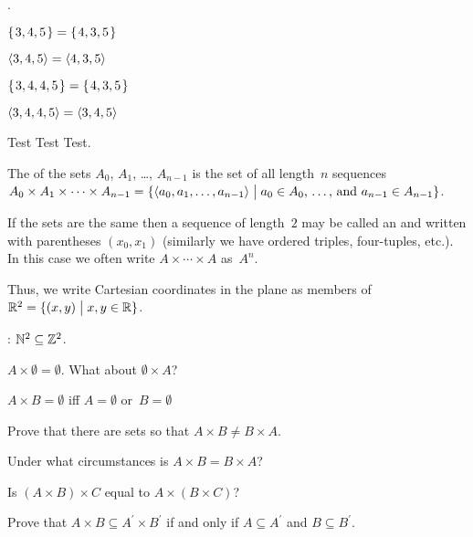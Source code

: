 \documentclass{ibl}
\begin{document}
\begin{ex}\pord.
\begin{exes}
\item $\mbox{$\{\hspace{0.1em}3, 4, 5\hspace{0.1em}\}$}=\mbox{$\{\hspace{0.1em}4, 3, 5\hspace{0.1em}\}$}$
\item $\langle3, 4, 5\rangle=\langle4, 3, 5\rangle$
\item $\mbox{$\{\hspace{0.1em}3, 4, 4, 5\hspace{0.1em}\}$}=\mbox{$\{\hspace{0.1em}4, 3, 5\hspace{0.1em}\}$}$
\item $\langle3, 4,4,5\rangle=\langle3,4,5\rangle$  
\end{exes}
\begin{ans}
 Test Test Test.
\end{ans}
\end{ex}

\begin{df}
The  of the sets $A_0$, $A_1$, \ldots, $A_{n-1}$ 
is the set of all length~$n$ sequences
$A_0\times A_1\times \cdots \times A_{n-1}
  =\{\langle a_0,a_1,\ldots,a_{n-1}\rangle \bigm| \text{$a_0\in A_0$, \ldots, and~$a_{n-1}\in A_{n-1}$}\}$.

If the sets are the same then 
a sequence of length~$2$ may be called an  and 
written with parentheses $(x_0,x_1)$
(similarly we have ordered triples, four-tuples, etc.).
In this case we often write $A\times\cdots\times A$ 
as~$A^n$.
\end{df}

Thus, we write 
Cartesian coordinates in the plane as members of
$\mathbb{R}^2=\{(x,y) \bigm| x,y\in\mathbb{R}\}$.

\begin{ex}
\pord:  $\mathbb{N}^2\subseteq \mathbb{Z}^2$.  
\end{ex}

\begin{ex}
\begin{exes}
\item $A\times \emptyset=\emptyset$.
  What about $\emptyset\times A$?
\item $A\times B=\emptyset$ iff $A=\emptyset$ or~$B=\emptyset$
\item Prove that there are sets so that $A\times B\neq B\times A$.
\item Under what circumstances is $A\times B=B\times A$?
\item Is $(A\times B)\times C$ equal to $A\times (B\times C)$?
\item Prove that $A\times B\subseteq A^\prime\times B^\prime$ if and only if
  $A\subseteq A^\prime$ and $B\subseteq B^\prime$.
\end{exes}
\end{ex}
\end{document}
